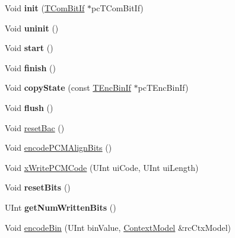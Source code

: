 \begin{DoxyCompactItemize}
\item 
\mbox{\label{class_t_enc_bin_c_a_b_a_c_ae0079d45359092a97af7d07eee1058cf}} 
Void {\bfseries init} (\hyperlink{class_t_com_bit_if}{T\+Com\+Bit\+If} $\ast$pc\+T\+Com\+Bit\+If)
\item 
\mbox{\label{class_t_enc_bin_c_a_b_a_c_a50cde66ad7b21cf4fce4c639666ce70d}} 
Void {\bfseries uninit} ()
\item 
\mbox{\label{class_t_enc_bin_c_a_b_a_c_a906748db0d058078bf9c7ee3da111ca8}} 
Void {\bfseries start} ()
\item 
\mbox{\label{class_t_enc_bin_c_a_b_a_c_aee485457cddfe9a7365bd6e8f7f1e92c}} 
Void {\bfseries finish} ()
\item 
\mbox{\label{class_t_enc_bin_c_a_b_a_c_a92f3a8616b4fafe0b51f3a1be46c3be2}} 
Void {\bfseries copy\+State} (const \hyperlink{class_t_enc_bin_if}{T\+Enc\+Bin\+If} $\ast$pc\+T\+Enc\+Bin\+If)
\item 
\mbox{\label{class_t_enc_bin_c_a_b_a_c_a980526c689d5a2b9340a6be8efa3b1da}} 
Void {\bfseries flush} ()
\item 
Void \hyperlink{class_t_enc_bin_c_a_b_a_c_aa1ae237265463d981de9a6cdbd1be2d3}{reset\+Bac} ()
\item 
Void \hyperlink{class_t_enc_bin_c_a_b_a_c_a1efab8efeb60a42f07c6c4515d929911}{encode\+P\+C\+M\+Align\+Bits} ()
\item 
Void \hyperlink{class_t_enc_bin_c_a_b_a_c_a07980c0398a2aa75dab8b4e5d19f67aa}{x\+Write\+P\+C\+M\+Code} (U\+Int ui\+Code, U\+Int ui\+Length)
\item 
\mbox{\label{class_t_enc_bin_c_a_b_a_c_a2e931bca7bded9d11513e271e71550dd}} 
Void {\bfseries reset\+Bits} ()
\item 
\mbox{\label{class_t_enc_bin_c_a_b_a_c_a1ec337c4a32acce623102edac9c1ba12}} 
U\+Int {\bfseries get\+Num\+Written\+Bits} ()
\item 
Void \hyperlink{class_t_enc_bin_c_a_b_a_c_a9e5762c4608e50ce0352a97e2b3c1357}{encode\+Bin} (U\+Int bin\+Value, \hyperlink{class_context_model}{Context\+Model} \&rc\+Ctx\+Model)

\end{DoxyCompactItemize}
